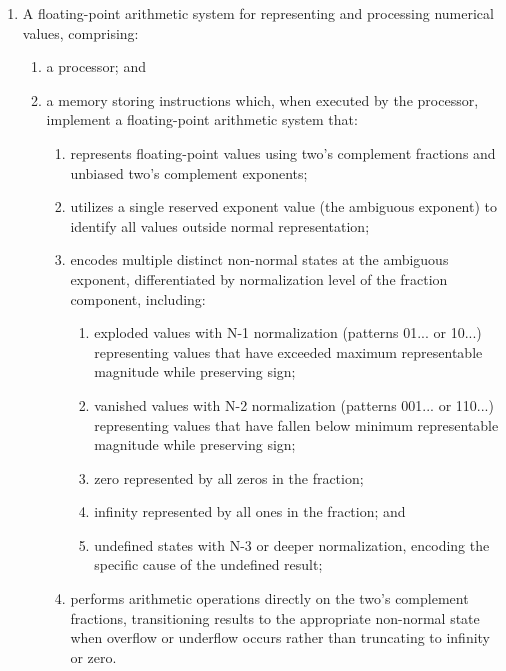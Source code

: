 \documentclass[12pt,letter]{article}
\begin{document}
\begin{enumerate}
    \item A floating-point arithmetic system for representing and processing numerical values, comprising:
        \begin{enumerate}
            \item a processor; and
            \item a memory storing instructions which, when executed by the processor, implement a floating-point arithmetic system that:
                \begin{enumerate}
                    \item represents floating-point values using two's complement fractions and unbiased two's complement exponents;
                    \item utilizes a single reserved exponent value (the ambiguous exponent) to identify all values outside normal representation;
                    \item encodes multiple distinct non-normal states at the ambiguous exponent, differentiated by normalization level of the fraction component, including:
                        \begin{enumerate}
                            \item exploded values with N-1 normalization (patterns 01... or 10...) representing values that have exceeded maximum representable magnitude while preserving sign;
                            \item vanished values with N-2 normalization (patterns 001... or 110...) representing values that have fallen below minimum representable magnitude while preserving sign;
                            \item zero represented by all zeros in the fraction;
                            \item infinity represented by all ones in the fraction; and
                            \item undefined states with N-3 or deeper normalization, encoding the specific cause of the undefined result;
                        \end{enumerate}
                    \item performs arithmetic operations directly on the two's complement fractions, transitioning results to the appropriate non-normal state when overflow or underflow occurs rather than truncating to infinity or zero.
                \end{enumerate}
        \end{enumerate}


\end{enumerate}
\end{document}
